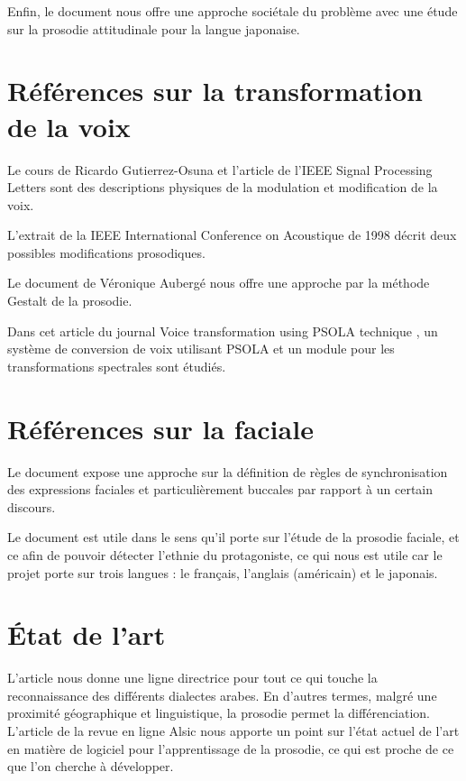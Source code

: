 \documentclass[a4paper,twoside,10pt]{report}
\begin{document}
Enfin, le document \cite{fourer:hal-00992083} nous offre une approche sociétale du problème avec une étude sur la prosodie attitudinale pour la langue japonaise.



\section{Références sur la transformation de la voix}\label{ref_transfo_voix}

Le cours de Ricardo Gutierrez-Osuna \cite{Gutierrez-Osuna:ISP-PMS} et l'article de l'IEEE Signal Processing Letters \cite{haagen1994transformation} sont des descriptions physiques de la modulation et modification de la voix.

L'extrait de la IEEE International Conference on Acoustique de 1998 \cite{Acero:ICASSP98-II-881} décrit deux possibles modifications prosodiques.

Le document de Véronique Aubergé \cite{auberge2002gestalt} nous offre une approche par la méthode Gestalt de la prosodie.

Dans cet article du journal Voice transformation using PSOLA technique \cite{valbret1992voice}, un système de conversion de voix utilisant PSOLA et un module pour les transformations spectrales sont étudiés.

\section{Références sur la faciale}\label{ref_transfo_faciales}

Le document \cite{beskow1995rule} expose une approche sur la définition de règles de synchronisation des expressions faciales et particulièrement buccales par rapport à un certain discours.

Le document \cite{matsumoto1992american} est utile dans le sens qu'il porte sur l'étude de la prosodie faciale, et ce afin de pouvoir détecter l'ethnie du protagoniste, ce qui nous est utile car le projet porte sur trois langues : le français, l'anglais (américain) et le japonais.


\section{État de l'art}\label{state_of_the_art}

L'article \cite{rouas2006identification} nous donne une ligne directrice pour tout ce qui touche la reconnaissance des différents dialectes arabes. En d'autres termes, malgré une proximité géographique et linguistique, la prosodie permet la différenciation.
L'article de la revue en ligne Alsic \cite{10.4000/alsic.332} nous apporte un point sur l'état actuel de l'art en matière de logiciel pour l'apprentissage de la prosodie, ce qui est proche de ce que l'on cherche à développer.
\end{document}
